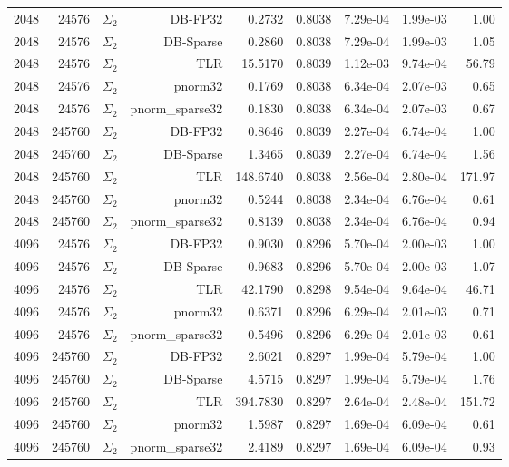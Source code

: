 \begin{tabular}{|r|r|r|r|r|r|r|r|r|}
  2048 & 24576 & $\Sigma_2$ & DB-FP32 & 0.2732 & 0.8038 & 7.29e-04 & 1.99e-03 & 1.00 \\
  2048 & 24576 & $\Sigma_2$ & DB-Sparse & 0.2860 & 0.8038 & 7.29e-04 & 1.99e-03 & 1.05 \\
  2048 & 24576 & $\Sigma_2$ & TLR & 15.5170 & 0.8039 & 1.12e-03 & 9.74e-04 & 56.79 \\
  2048 & 24576 & $\Sigma_2$ & pnorm32 & 0.1769 & 0.8038 & 6.34e-04 & 2.07e-03 & 0.65 \\
  2048 & 24576 & $\Sigma_2$ & pnorm\_sparse32 & 0.1830 & 0.8038 & 6.34e-04 & 2.07e-03 & 0.67 \\
  2048 & 245760 & $\Sigma_2$ & DB-FP32 & 0.8646 & 0.8039 & 2.27e-04 & 6.74e-04 & 1.00 \\
  2048 & 245760 & $\Sigma_2$ & DB-Sparse & 1.3465 & 0.8039 & 2.27e-04 & 6.74e-04 & 1.56 \\
  2048 & 245760 & $\Sigma_2$ & TLR & 148.6740 & 0.8038 & 2.56e-04 & 2.80e-04 & 171.97 \\
  2048 & 245760 & $\Sigma_2$ & pnorm32 & 0.5244 & 0.8038 & 2.34e-04 & 6.76e-04 & 0.61 \\
  2048 & 245760 & $\Sigma_2$ & pnorm\_sparse32 & 0.8139 & 0.8038 & 2.34e-04 & 6.76e-04 & 0.94 \\
  4096 & 24576 & $\Sigma_2$ & DB-FP32 & 0.9030 & 0.8296 & 5.70e-04 & 2.00e-03 & 1.00 \\
  4096 & 24576 & $\Sigma_2$ & DB-Sparse & 0.9683 & 0.8296 & 5.70e-04 & 2.00e-03 & 1.07 \\
  4096 & 24576 & $\Sigma_2$ & TLR & 42.1790 & 0.8298 & 9.54e-04 & 9.64e-04 & 46.71 \\
  4096 & 24576 & $\Sigma_2$ & pnorm32 & 0.6371 & 0.8296 & 6.29e-04 & 2.01e-03 & 0.71 \\
  4096 & 24576 & $\Sigma_2$ & pnorm\_sparse32 & 0.5496 & 0.8296 & 6.29e-04 & 2.01e-03 & 0.61 \\
  4096 & 245760 & $\Sigma_2$ & DB-FP32 & 2.6021 & 0.8297 & 1.99e-04 & 5.79e-04 & 1.00 \\
  4096 & 245760 & $\Sigma_2$ & DB-Sparse & 4.5715 & 0.8297 & 1.99e-04 & 5.79e-04 & 1.76 \\
  4096 & 245760 & $\Sigma_2$ & TLR & 394.7830 & 0.8297 & 2.64e-04 & 2.48e-04 & 151.72 \\
  4096 & 245760 & $\Sigma_2$ & pnorm32 & 1.5987 & 0.8297 & 1.69e-04 & 6.09e-04 & 0.61 \\
  4096 & 245760 & $\Sigma_2$ & pnorm\_sparse32 & 2.4189 & 0.8297 & 1.69e-04 & 6.09e-04 & 0.93 \\

\end{tabular}
